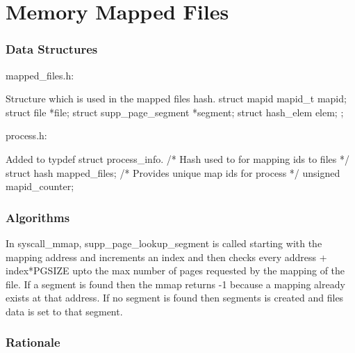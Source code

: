 \part{Memory Mapped Files}

\section{Data Structures}


mapped\_files.h:

Structure which is used in the mapped files hash.
struct mapid
  {
    mapid\_t mapid;
    struct file *file;
    struct supp\_page\_segment *segment;
    struct hash\_elem elem;
  };

process.h:

Added to typdef struct process\_info. 
  /* Hash used to for mapping ids to files */
  struct hash mapped\_files;
  /* Provides unique map ids for process */
  unsigned mapid\_counter;
  
\section{Algorithms}




In syscall\_mmap, supp\_page\_lookup\_segment is called starting with the mapping address and increments an index and then checks every address + index*PGSIZE upto the max number of pages requested by the mapping of the file. If a segment is found then the mmap returns -1 because a mapping already exists at that address. If no segment is found then segments is created and files data is set to that segment.


\section{Rationale}

